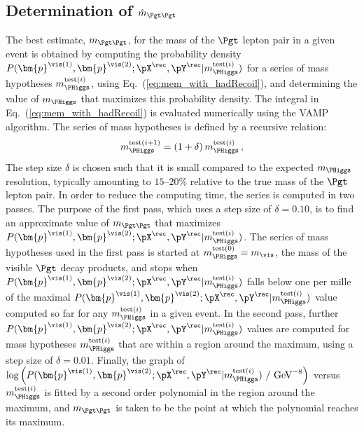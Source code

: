 \subsection{Determination of $\hat{m}_{\Pgt\Pgt}$}
\label{sec:mem_numericalMaximization}

The best estimate, $m_{\Pgt\Pgt}$, for the mass of the $\Pgt$ lepton pair in a given event
is obtained by computing the probability density $P(\bm{p}^{\vis(1)},\bm{p}^{\vis(2)};\pX^{\rec},\pY^{\rec}|m_{\PHiggs}^{\textrm{test}(i)})$ 
for a series of mass hypotheses $m_{\PHiggs}^{\textrm{test}(i)}$, using Eq.~(\ref{eq:mem_with_hadRecoil}), and determining the value of $m_{\PHiggs}$ that maximizes this probability density.
The integral in Eq.~(\ref{eq:mem_with_hadRecoil}) is evaluated numerically using the VAMP algorithm.
The series of mass hypotheses is defined by a recursive relation: 
\begin{equation}
m_{\PHiggs}^{\textrm{test}(i + 1)} = (1 + \delta) \,  m_{\PHiggs}^{\textrm{test}(i)} \, ,
\label{eq:mTauTau_step_size}
\end{equation}
The step size $\delta$ is chosen such that it is small compared to the expected $m_{\PHiggs}$ resolution,
typically amounting to $15$--$20\%$ relative to the true mass of the $\Pgt$ lepton pair.
In order to reduce the computing time, the series is computed in two passes.
The purpose of the first pass, which uses a step size of $\delta = 0.10$, is to find an approximate value of $m_{\Pgt\Pgt}$
that maximizes $P(\bm{p}^{\vis(1)},\bm{p}^{\vis(2)};\pX^{\rec},\pY^{\rec}|m_{\PHiggs}^{\textrm{test}(i)})$.
The series of mass hypotheses used in the first pass is started at $m_{\PHiggs}^{\textrm{test}(0)} = m_{\vis}$,
the mass of the visible $\Pgt$ decay products, 
and stops when $P(\bm{p}^{\vis(1)},\bm{p}^{\vis(2)};\pX^{\rec},\pY^{\rec}|m_{\PHiggs}^{\textrm{test}(i)})$ falls below one per mille 
of the maximal $P(\bm{p}^{\vis(1)},\bm{p}^{\vis(2)};\pX^{\rec},\pY^{\rec}|m_{\PHiggs}^{\textrm{test}(i)})$ value
computed so far for any $m_{\PHiggs}^{\textrm{test}(i)}$ in a given event.
In the second pass, further $P(\bm{p}^{\vis(1)},\bm{p}^{\vis(2)};\pX^{\rec},\pY^{\rec}|m_{\PHiggs}^{\textrm{test}(i)})$ values 
are computed for mass hypotheses $m_{\PHiggs}^{\textrm{test}(i)}$ that are within a region around the maximum,
using a step size of $\delta = 0.01$.
Finally, the graph of $\log \left( P(\bm{p}^{\vis(1)},\bm{p}^{\vis(2)};\pX^{\rec},\pY^{\rec}|m_{\PHiggs}^{\textrm{test}(i)})~/\mbox{~GeV}^{-8} \right)$ 
versus $m_{\PHiggs}^{\textrm{test}(i)}$ is fitted by a second order polynomial
in the region around the maximum,
and $m_{\Pgt\Pgt}$ is taken to be the point at which the polynomial reaches its maximum.
